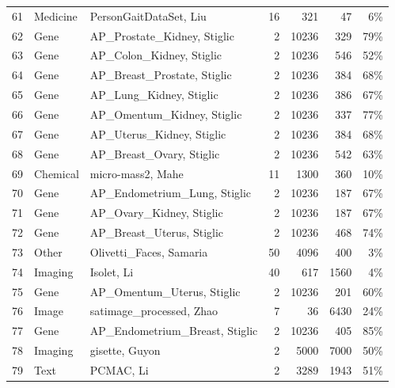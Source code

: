 \documentclass[preprint,12pt,authoryear]{elsarticle}
\begin{document}
{\begin{longtable}{@{}r p{1.9cm} p{6.7cm} r r r r@{}}
61 & Medicine & PersonGaitDataSet, Liu \citeyearpar{gait_classification_604} & 16 & 321 & 47 & 6\% \\
62 & Gene & AP\_Prostate\_Kidney, Stiglic \citeyearpar{stiglic2010stability} & 2 & 10236 & 329 & 79\% \\
63 & Gene & AP\_Colon\_Kidney, Stiglic \citeyearpar{stiglic2010stability} & 2 & 10236 & 546 & 52\% \\
64 & Gene & AP\_Breast\_Prostate, Stiglic \citeyearpar{stiglic2010stability} & 2 & 10236 & 384 & 68\% \\
65 & Gene & AP\_Lung\_Kidney, Stiglic \citeyearpar{stiglic2010stability} & 2 & 10236 & 386 & 67\% \\
66 & Gene & AP\_Omentum\_Kidney, Stiglic \citeyearpar{stiglic2010stability} & 2 & 10236 & 337 & 77\% \\
67 & Gene & AP\_Uterus\_Kidney, Stiglic \citeyearpar{stiglic2010stability} & 2 & 10236 & 384 & 68\% \\
68 & Gene & AP\_Breast\_Ovary, Stiglic \citeyearpar{stiglic2010stability} & 2 & 10236 & 542 & 63\% \\
69 & Chemical & micro-mass2, Mahe \citeyearpar{mahe2014automatic} & 11 & 1300 & 360 & 10\% \\
70 & Gene & AP\_Endometrium\_Lung, Stiglic \citeyearpar{stiglic2010stability} & 2 & 10236 & 187 & 67\% \\
71 & Gene & AP\_Ovary\_Kidney, Stiglic \citeyearpar{stiglic2010stability} & 2 & 10236 & 187 & 67\% \\
72 & Gene & AP\_Breast\_Uterus, Stiglic \citeyearpar{stiglic2010stability} & 2 & 10236 & 468 & 74\% \\
73 & Other & Olivetti\_Faces, Samaria \citeyearpar{samaria1994parameterisation} & 50 & 4096 & 400 & 3\% \\
74 & Imaging & Isolet, Li \citeyearpar{li2017feature} & 40 & 617 & 1560 & 4\% \\
75 & Gene & AP\_Omentum\_Uterus, Stiglic \citeyearpar{stiglic2010stability} & 2 & 10236 & 201 & 60\% \\
76 & Image & satimage\_processed, Zhao \citeyearpar{zhao2024weakly} & 7 & 36 & 6430 & 24\% \\
77 & Gene & AP\_Endometrium\_Breast, Stiglic \citeyearpar{stiglic2010stability} & 2 & 10236 & 405 & 85\% \\
78 & Imaging & gisette, Guyon \citeyearpar{guyon2004result} & 2 & 5000 & 7000 & 50\% \\
79 & Text & PCMAC, Li \citeyearpar{li2017feature} & 2 & 3289 & 1943 & 51\% \\

\end{longtable}}
\end{document}
